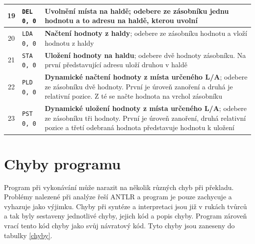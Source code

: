 \documentclass[
12pt,
a4paper,
pdftex,
czech,
titlepage
]{report}
\begin{document}
\begin{longtable}{|c|l|p{10cm}|}
\rule{0pt}{3ex} 19 & \texttt{DEL 0, 0} & \textbf{Uvolnění místa na haldě}; odebere ze zásobníku jednu hodnotu a to adresu na haldě, kterou uvolní \\ \hline
\rule{0pt}{3ex} 20 & \texttt{LDA 0, 0} & \textbf{Načtení hodnoty z haldy}; odebere ze zásobníku hodnotu a vloží hodnotu z haldy \\ \hline
\rule{0pt}{3ex} 21 & \texttt{STA 0, 0} & \textbf{Uložení hodnoty na haldu}; odebere dvě hodnoty zásobníku. Na první představující adresu uloží druhou v haldě \\ \hline
\rule{0pt}{3ex} 22 & \texttt{PLD 0, 0} & \textbf{Dynamické načtení hodnoty z místa určeného L/A}; odebere ze zásobníku dvě hodnoty. První je úroveň zanoření a druhá je relativní pozice. Z té se načte hodnota na vrchol zásobníku  \\ \hline
\rule{0pt}{3ex} 23 & \texttt{PST 0, 0} & \textbf{Dynamické uložení hodnoty z místa určeného L/A}; odebere ze zásobníku tři hodnoty. První je úroveň zanoření, druhá relativní pozice a třetí odebraná hodnota představuje hodnotu k uložení \\ \hline
\end{longtable}
\section{Chyby programu}
Program při vykonávání může narazit na několik různých chyb při překladu. Problémy nalezené při analýze řeší ANTLR a program je pouze zachycuje a vyhazuje jako výjimku. Chyby při syntéze a interpretaci jsou již v rukách tvůrců a tak byly sestaveny jednotlivé chyby, jejich kód a popis chyby. Program zároveň vrací tento kód chyby jako svůj návratový kód. Tyto chyby jsou zaneseny do tabulky \ref{chyby}.
\end{document}
